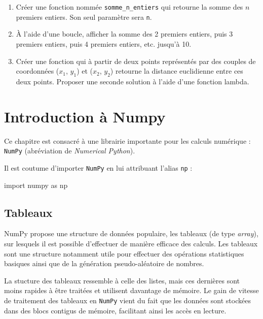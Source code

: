 \documentclass[12pt,]{book}
\newenvironment{Shaded}{\begin{snugshade}}{\end{snugshade}}
\newcommand{\ImportTok}[1]{#1}
\newcommand{\NormalTok}[1]{#1}
\providecommand{\tightlist}{%
  \setlength{\itemsep}{0pt}\setlength{\parskip}{0pt}}
\numberwithin{equation}{section}
\numberwithin{countremarque}{section}
\let\BeginKnitrBlock\begin \let\EndKnitrBlock\end
\begin{document}
\BeginKnitrBlock{exframe}
\begin{enumerate}
\def\labelenumi{\arabic{enumi}.}
\tightlist
\item
  Créer une fonction nommée \texttt{somme\_n\_entiers} qui retourne la
  somme des \(n\) premiers entiers. Son seul paramètre sera \texttt{n}.
\item
  À l'aide d'une boucle, afficher la somme des 2 premiers entiers, puis
  3 premiers entiers, puis 4 premiers entiers, etc. jusqu'à 10.
\item
  Créer une fonction qui à partir de deux points représentés par des
  couples de coordonnées (\(x_1\), \(y_1\)) et (\(x_2\), \(y_2\))
  retourne la distance euclidienne entre ces deux points. Proposer une
  seconde solution à l'aide d'une fonction lambda.
\end{enumerate}
\EndKnitrBlock{exframe}

\chapter{Introduction à Numpy}\label{numpy}

Ce chapitre est consacré à une librairie importante pour les calculs
numérique : \texttt{NumPy} (abréviation de \emph{Numerical Python}).

Il est coutume d'importer \texttt{NumPy} en lui attribuant l'alias
\texttt{np} :

\begin{Shaded}
\begin{Highlighting}[]
\ImportTok{import}\NormalTok{ numpy }\ImportTok{as}\NormalTok{ np}
\end{Highlighting}
\end{Shaded}

\section{Tableaux}\label{numpy-tableaux}

NumPy propose une structure de données populaire, les tableaux (de type
\emph{array}), sur lesquels il est possible d'effectuer de manière
efficace des calculs. Les tableaux sont une structure notamment utile
pour effectuer des opérations statistiques basiques ainsi que de la
génération pseudo-aléatoire de nombres.

La stucture des tableaux ressemble à celle des listes, mais ces
dernières sont moins rapides à être traitées et utilisent davantage de
mémoire. Le gain de vitesse de traitement des tableaux en \texttt{NumPy}
vient du fait que les données sont stockées dans des blocs contigus de
mémoire, facilitant ainsi les accès en lecture.
\end{document}
